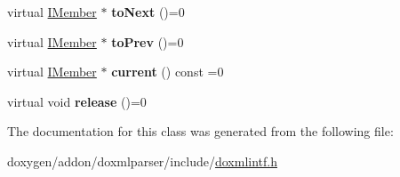 \begin{DoxyCompactItemize}
virtual \mbox{\hyperlink{class_i_member}{I\+Member}} $\ast$ {\bfseries to\+Next} ()=0
\item 
\mbox{\label{class_i_member_iterator_a2b23b711e8956f275db92029e6f0571f}} 
virtual \mbox{\hyperlink{class_i_member}{I\+Member}} $\ast$ {\bfseries to\+Prev} ()=0
\item 
\mbox{\label{class_i_member_iterator_a94c79a3d53d06d141ee419103f2f24a5}} 
virtual \mbox{\hyperlink{class_i_member}{I\+Member}} $\ast$ {\bfseries current} () const =0
\item 
\mbox{\label{class_i_member_iterator_a88aac68a285813f5bc37b6da24648cd8}} 
virtual void {\bfseries release} ()=0
\end{DoxyCompactItemize}


The documentation for this class was generated from the following file\+:\begin{DoxyCompactItemize}
\item 
doxygen/addon/doxmlparser/include/\mbox{\hyperlink{include_2doxmlintf_8h}{doxmlintf.\+h}}\end{DoxyCompactItemize}
